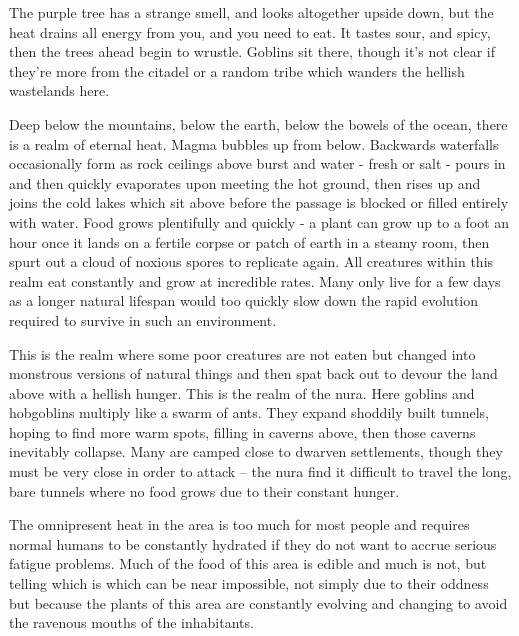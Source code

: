 \begin{multicols}{2}

\begin{boxtext}
	The purple tree has a strange smell, and looks altogether upside down, but the heat drains all energy from you, and you need to eat.  It tastes sour, and spicy, then the trees ahead begin to wrustle.  Goblins sit there, though it's not clear if they're more from the citadel or a random tribe which wanders the hellish wastelands here.
\end{boxtext}

Deep below the mountains, below the earth, below the bowels of the ocean, there is a realm of eternal heat.  Magma bubbles up from below.  Backwards waterfalls occasionally form as rock ceilings above burst and water - fresh or salt - pours in and then quickly evaporates upon meeting the hot ground, then rises up and joins the cold lakes which sit above before the passage is blocked or filled entirely with water.  Food grows plentifully and quickly - a plant can grow up to a foot an hour once it lands on a fertile corpse or patch of earth in a steamy room, then spurt out a cloud of noxious spores to replicate again.  All creatures within this realm eat constantly and grow at incredible rates.  Many only live for a few days as a longer natural lifespan would too quickly slow down the rapid evolution required to survive in such an environment.

	This is the realm where some poor creatures are not eaten but changed into monstrous versions of natural things and then spat back out to devour the land above with a hellish hunger.  This is the realm of the nura.  Here goblins and hobgoblins multiply like a swarm of ants.  They expand shoddily built tunnels, hoping to find more warm spots, filling in caverns above, then those caverns inevitably collapse.  Many are camped close to dwarven settlements, though they must be very close in order to attack -- the nura find it difficult to travel the long, bare tunnels where no food grows due to their constant hunger.

	The omnipresent heat in the area is too much for most people and requires normal humans to be constantly hydrated if they do not want to accrue serious fatigue problems.  Much of the food of this area is edible and much is not, but telling which is which can be near impossible, not simply due to their oddness but because the plants of this area are constantly evolving and changing to avoid the ravenous mouths of the inhabitants.


\end{multicols}
